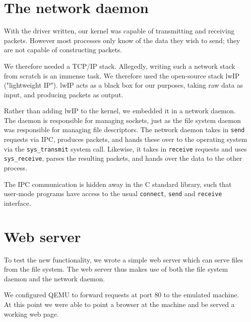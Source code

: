 \documentclass{report}
\begin{document}



\section{The network daemon}
With the driver written, our kernel was capable of transmitting and receiving
packets. However most processes only know of the data they wish to send; they
are not capable of constructing packets.

We therefore needed a TCP/IP stack. Allegedly, writing such a network stack
from scratch is an immense task. We therefore used the open-source stack lwIP
("lightweight IP"). lwIP acts as a black box for our purposes, taking raw data
as input, and producing packets as output.

Rather than adding lwIP to the kernel, we embedded it in a network daemon. The
daemon is responsible for managing sockets, just as the file system daemon was
responsible for managing file descriptors. The network daemon takes in
\texttt{send} requests via IPC, produces packets, and hands these over to the
operating system via the \texttt{sys\_transmit} system call. Likewise, it
takes in \texttt{receive} requests and uses \texttt{sys\_receive}, parses the
resulting packets, and hands over the data to the other process.

The IPC communication is hidden away in the C standard library, such that
user-mode programs have access to the usual \texttt{connect}, \texttt{send}
and \texttt{receive} interface.



\section{Web server}
To test the new functionality, we wrote a simple web server which can serve
files from the file system. The web server thus makes use of both the file
system daemon and the network daemon. 

We configured QEMU to forward requests at port 80 to the emulated machine. At
this point we were able to point a browser at the machine and be served a
working web page.
\end{document}
